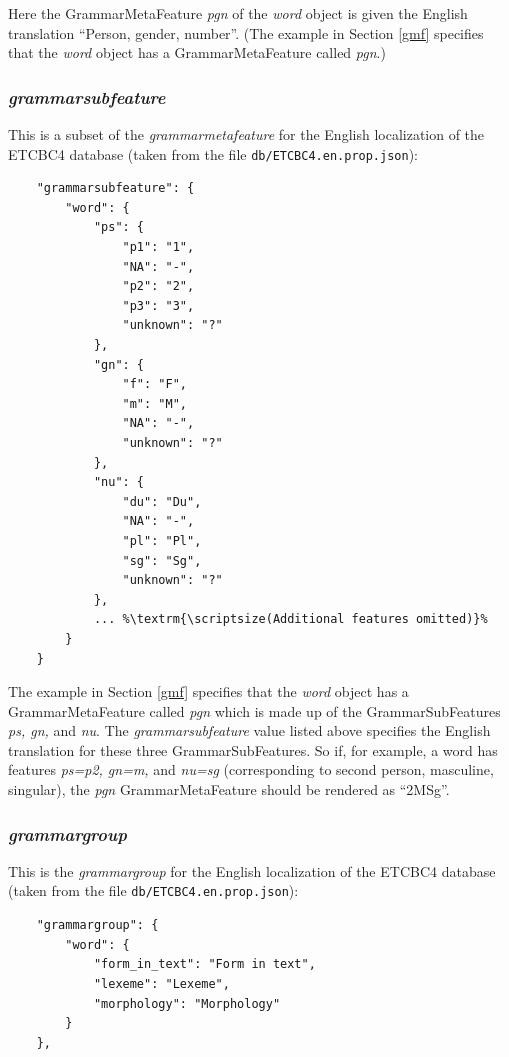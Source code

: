 \documentclass[11pt,oneside,a4paper]{memoir}
\begin{document}
Here the GrammarMetaFeature \emph{pgn} of the \emph{word} object is given the English translation
``Person, gender, number''. (The example in Section \ref{gmf} specifies that the \emph{word}
object has a GrammarMetaFeature called \emph{pgn}.)

\subsubsection{\emph{grammarsubfeature}}

This is a subset of the \emph{grammarmetafeature} for the English localization of the
ETCBC4 database (taken from the file \texttt{db/ETCBC4.en.prop.json}):

\begin{lstlisting}
    "grammarsubfeature": {
        "word": {
            "ps": {
                "p1": "1",
                "NA": "-",
                "p2": "2",
                "p3": "3",
                "unknown": "?"
            },
            "gn": {
                "f": "F",
                "m": "M",
                "NA": "-",
                "unknown": "?"
            },
            "nu": {
                "du": "Du",
                "NA": "-",
                "pl": "Pl",
                "sg": "Sg",
                "unknown": "?"
            },
            ... %\textrm{\scriptsize(Additional features omitted)}%
        }
    }
\end{lstlisting}

The example in Section \ref{gmf} specifies that the \emph{word} object has a GrammarMetaFeature
called \emph{pgn} which is made up of the GrammarSubFeatures \emph{ps, gn,} and \emph{nu}. The
\emph{grammarsubfeature} value listed above specifies the English translation for these three
GrammarSubFeatures. So if, for example, a word has features \emph{ps=p2, gn=m,} and \emph{nu=sg}
(corresponding to second person, masculine, singular), the \emph{pgn} GrammarMetaFeature should be
rendered as ``2MSg''.


\subsubsection{\emph{grammargroup}}

This is the \emph{grammargroup} for the English localization of the ETCBC4 database (taken from the
file \texttt{db/ETCBC4.en.prop.json}):

\begin{lstlisting}
    "grammargroup": {
        "word": {
            "form_in_text": "Form in text",
            "lexeme": "Lexeme",
            "morphology": "Morphology"
        }
    },
\end{lstlisting}
\end{document}
